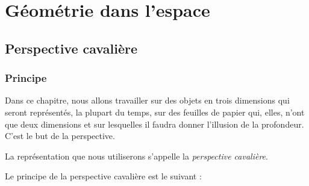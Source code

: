 \chapter{G\'eom\'etrie dans l'espace} \label{calcesp}
\minitoc

\fancyhead{} %
\fancyhead[LE,RO]{\footnotesize \em \rightmark} %

    \fancyfoot{}
    \fancyfoot[LE,RO]{\textbf{\thepage}}




\section{Perspective cavalière}

\subsection{Principe}
 Dans ce chapitre, nous allons travailler sur des objets en trois dimensions qui seront représentés, la plupart du temps, sur des feuilles de papier qui, elles, n'ont que deux dimensions et sur lesquelles il faudra donner l'illusion de la profondeur. C'est le but de la perspective.
 
 \medskip

La représentation que nous utiliserons s'appelle la \emph{perspective cavalière}.

Le principe de la perspective cavali\`ere est le suivant :



